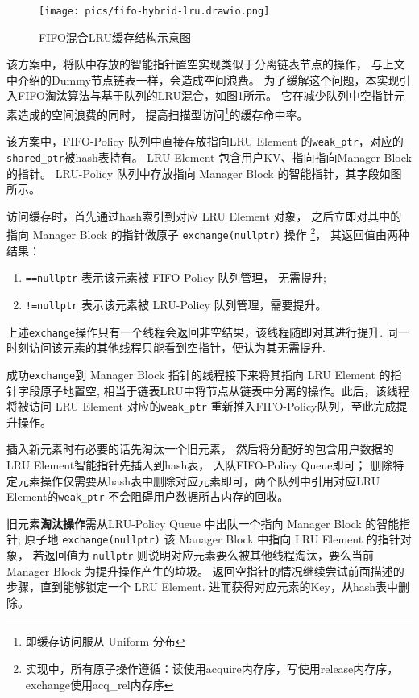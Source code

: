 \begin{figure}
    \centering
    \texttt{[image: pics/fifo-hybrid-lru.drawio.png]}
    \caption{FIFO混合LRU缓存结构示意图}
    \label{fig:fifo-h}
\end{figure}

该方案中，将队中存放的智能指针置空实现类似于分离链表节点的操作，
与上文中介绍的Dummy节点链表一样，会造成空间浪费。
为了缓解这个问题，本实现引入FIFO淘汰算法与基于队列的LRU混合，如图\ref{fig:fifo-h}所示。
它在减少队列中空指针元素造成的空间浪费的同时，
提高扫描型访问\footnote{即缓存访问服从 Uniform 分布}的缓存命中率。

该方案中，FIFO-Policy 队列中直接存放指向LRU Element 的\verb|weak_ptr|，对应的\verb|shared_ptr|被hash表持有。
LRU Element 包含用户KV、指向指向Manager Block 的指针。
LRU-Policy 队列中存放指向 Manager Block 的智能指针，其字段如图所示。

访问缓存时，首先通过hash索引到对应 LRU Element 对象，
之后立即对其中的指向 Manager Block 的指针做原子 \verb|exchange(nullptr)| 操作
\footnote{实现中，所有原子操作遵循：读使用acquire内存序，写使用release内存序，exchange使用acq\_rel内存序}，
其返回值由两种结果：
\begin{enumerate}
    \item \verb|==nullptr| 表示该元素被 FIFO-Policy 队列管理， 无需提升;
    \item \verb|!=nullptr| 表示该元素被 LRU-Policy 队列管理，需要提升。
\end{enumerate}
上述\verb|exchange|操作只有一个线程会返回非空结果，该线程随即对其进行提升.
同一时刻访问该元素的其他线程只能看到空指针，便认为其无需提升.

成功\verb|exchange|到 Manager Block 指针的线程接下来将其指向 LRU Element 的指针字段原子地置空,
相当于链表LRU中将节点从链表中分离的操作。此后，该线程将被访问 LRU Element 对应的\verb|weak_ptr|
重新推入FIFO-Policy队列，至此完成提升操作。

插入新元素时有必要的话先淘汰一个旧元素，
然后将分配好的包含用户数据的LRU Element智能指针先插入到hash表，
入队FIFO-Policy Queue即可；
删除特定元素操作仅需要从hash表中删除对应元素即可，两个队列中引用对应LRU Element的\verb|weak_ptr|
不会阻碍用户数据所占内存的回收。

旧元素\textbf{淘汰操作}需从LRU-Policy Queue 中出队一个指向 Manager Block 的智能指针;
原子地 \verb|exchange(nullptr)| 该 Manager Block 中指向 LRU Element 的指针对象，
若返回值为 \verb|nullptr| 则说明对应元素要么被其他线程淘汰，要么当前 Manager Block 为提升操作产生的垃圾。
返回空指针的情况继续尝试前面描述的步骤，直到能够锁定一个 LRU Element.
进而获得对应元素的Key，从hash表中删除。

